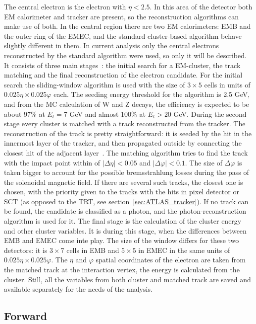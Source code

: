 The central electron is the electron with $\eta < 2.5$. In this area of the detector both EM calorimeter and tracker are present, so the reconstruction algorithms can make use of both. In the central region there are two  EM calorimeters: EMB and the outer ring of the EMEC, and the standard cluster-based algorithm behave slightly different in them. In current analysis only the central electrons reconstructed by the standard algorithm were used, so only it will be described. It consists of three main stages~\cite{lib:elec_reco}: the initial search for a EM-cluster, the track matching and the final reconstruction of the electron candidate. For the initial search the sliding-window algorithm is used with the size of $3 \times 5$ cells in units of $0.025 \eta \times 0.025 \varphi$ each. The seeding energy threshold for the algorithm is 2.5 GeV, and from the MC calculation of W and Z decays, the efficiency is expected to be about 97\% at $E_{t} = 7$ GeV and almost 100\% at $E_{t} > 20$ GeV. During the second stage every cluster is matched with a track reconstructed from the tracker. The reconstruction of the track is pretty straightforward: it is seeded by the hit in the innermost layer of the tracker, and then propagated outside by connecting the closest hit of the adjacent layer~\cite{lib:track_reco}. The matching algorithm tries to find the track with the impact point within of $|\Delta\eta| < 0.05$ and $|\Delta\varphi| < 0.1$. The size of $\Delta\varphi$ is taken bigger to account for the possible bremsstrahlung losses during the pass of the solenoidal magnetic field. If there are several such tracks, the closest one is chosen, with the priority given to the tracks with the hits in pixel detector or SCT (as opposed to the TRT, see section~\ref{sec:ATLAS_tracker}). If no track can be found, the candidate is classified as a photon, and the photon-reconstruction algorithm is used for it. The final stage is the calculation of the cluster energy and other cluster variables. It is during this stage, when the differences between EMB and EMEC come inte play. The size of the window differs for these two detectors: it is $3 \times 7$ cells in EMB and $5 \times 5$ in EMEC in the same units of $0.025 \eta \times 0.025 \varphi$. The $\eta$ and $\varphi$ spatial coordinates of the electron are taken from the matched track at the interaction vertex, the energy is calculated from the cluster. Still, all the variables from both cluster and matched track are saved and available separately for the needs of the analysis.

\subsection{Forward}

